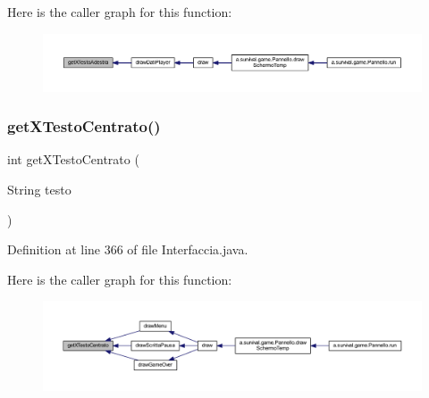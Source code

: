 Here is the caller graph for this function\+:
\nopagebreak
\begin{figure}[H]
\begin{center}
\leavevmode
\includegraphics[width=350pt]{classa_1_1survival_1_1game_1_1_interfaccia_a587ecc556d77a50194f3e80ca09551ce_icgraph}
\end{center}
\end{figure}
\mbox{\label{classa_1_1survival_1_1game_1_1_interfaccia_a33bfff0e4091d0c94334a82514ffa7ec}} 
\subsubsection{\texorpdfstring{get\+X\+Testo\+Centrato()}{getXTestoCentrato()}}
{\footnotesize\ttfamily int get\+X\+Testo\+Centrato (\begin{DoxyParamCaption}\item[{String}]{testo }\end{DoxyParamCaption})}



Definition at line 366 of file Interfaccia.\+java.

Here is the caller graph for this function\+:
\nopagebreak
\begin{figure}[H]
\begin{center}
\leavevmode
\includegraphics[width=350pt]{classa_1_1survival_1_1game_1_1_interfaccia_a33bfff0e4091d0c94334a82514ffa7ec_icgraph}
\end{center}
\end{figure}
\mbox{\label{classa_1_1survival_1_1game_1_1_interfaccia_a45d56bd84238e8b56589dfc732e2b2cf}} 
